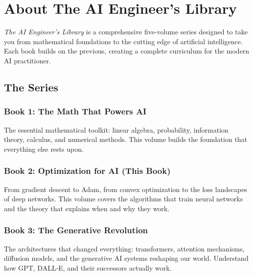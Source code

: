 \documentclass[../main.tex]{subfiles}
\begin{document}
\chapter*{About The AI Engineer's Library}

\textit{The AI Engineer's Library} is a comprehensive five-volume series designed to take you from mathematical foundations to the cutting edge of artificial intelligence. Each book builds on the previous, creating a complete curriculum for the modern AI practitioner.

\vspace{1cm}

\section*{The Series}

\subsection*{Book 1: The Math That Powers AI}

The essential mathematical toolkit: linear algebra, probability, information theory, calculus, and numerical methods. This volume builds the foundation that everything else rests upon.

\vspace{0.5cm}

\subsection*{Book 2: Optimization for AI (This Book)}

From gradient descent to Adam, from convex optimization to the loss landscapes of deep networks. This volume covers the algorithms that train neural networks and the theory that explains when and why they work.

\vspace{0.5cm}

\subsection*{Book 3: The Generative Revolution}

The architectures that changed everything: transformers, attention mechanisms, diffusion models, and the generative AI systems reshaping our world. Understand how GPT, DALL-E, and their successors actually work.
\end{document}
